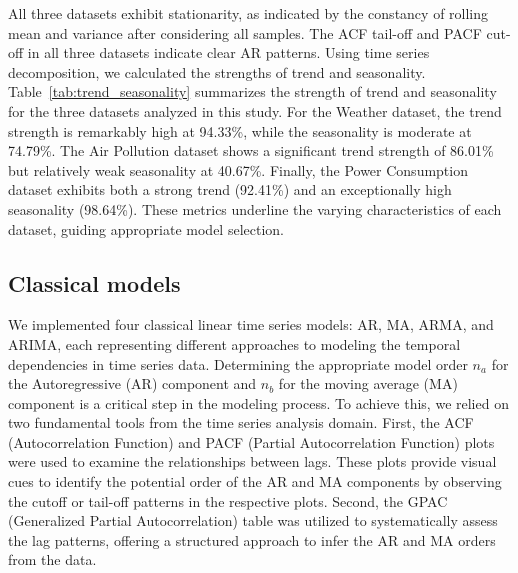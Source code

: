\documentclass{scrartcl}
\begin{document}
All three datasets exhibit stationarity, as indicated by the constancy of rolling mean and variance after considering all samples. The ACF tail-off and PACF cut-off in all three datasets indicate clear AR patterns. Using time series decomposition, we calculated the strengths of trend and seasonality. Table~\ref{tab:trend_seasonality} summarizes the strength of trend and seasonality for the three datasets analyzed in this study. For the Weather dataset, the trend strength is remarkably high at 94.33\%, while the seasonality is moderate at 74.79\%. The Air Pollution dataset shows a significant trend strength of 86.01\% but relatively weak seasonality at 40.67\%. Finally, the Power Consumption dataset exhibits both a strong trend (92.41\%) and an exceptionally high seasonality (98.64\%). These metrics underline the varying characteristics of each dataset, guiding appropriate model selection.



\subsection{Classical models}
We implemented four classical linear time series models: AR, MA, ARMA, and ARIMA, each representing different approaches to modeling the temporal dependencies in time series data. Determining the appropriate model order \(n_a\) for the Autoregressive (AR) component and \(n_b\) for the moving average (MA) component is a critical step in the modeling process. To achieve this, we relied on two fundamental tools from the time series analysis domain. First, the ACF (Autocorrelation Function) and PACF (Partial Autocorrelation Function) plots were used to examine the relationships between lags. These plots provide visual cues to identify the potential order of the AR and MA components by observing the cutoff or tail-off patterns in the respective plots. Second, the GPAC (Generalized Partial Autocorrelation) table was utilized to systematically assess the lag patterns, offering a structured approach to infer the AR and MA orders from the data.
\end{document}
